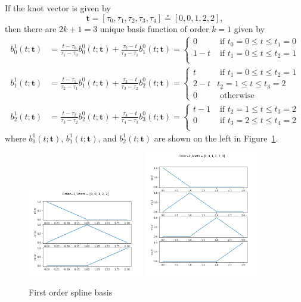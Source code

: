 \documentclass{article}
\newcommand{\defeq}{\circeq}
\begin{document}
If the knot vector is given by
\[
\mathbf{t} = [\tau_0, \tau_1, \tau_2, \tau_3, \tau_4] \defeq [0, 0, 1, 2, 2],
\]
then there are $2k+1=3$ unique basis function of order $k=1$ given by
\begin{align*}
b_0^1(t; \mathbf{t}) &= \frac{t-\tau_0}{\tau_1-\tau_0} b_0^0(t;\mathbf{t}) + \frac{\tau_2-t}{\tau_2-\tau_1}b_1^0(t; \mathbf{t}) 
	= \begin{cases} 0   & \text{~if~} t_0=0 \leq t \leq t_1=0 \\
				    1-t & \text{~if~} t_1=0 \leq t \leq t_2=1 \\ 
 	  \end{cases}
\\ 
b_1^1(t; \mathbf{t}) &= \frac{t-\tau_1}{\tau_2-\tau_1} b_1^0(t;\mathbf{t}) + \frac{\tau_3-t}{\tau_3-\tau_2}b_2^0(t; \mathbf{t})
	= \begin{cases} t & \text{~if~} t_1=0 \leq t \leq t_2=1 \\ 
 									2-t & t_2=1 \leq t \leq t_3=2 \\
 									0 & \text{~otherwise}
 					    \end{cases}
\\ 
b_2^1(t; \mathbf{t}) &= \frac{t-\tau_2}{\tau_3-\tau_2} b_2^0(t;\mathbf{t}) + \frac{\tau_4-t}{\tau_4-\tau_3}b_3^0(t; \mathbf{t})
	= \begin{cases} t-1 & \text{~if~} t_2=1 \leq t \leq t_3=2 \\ 
 					0 & \text{~if~} t_3=2 \leq t \leq t_4=2 \\
 	  \end{cases}
\end{align*}
where $b_0^1(t; \mathbf{t})$, $b_1^1(t; \mathbf{t})$, and $b_2^1(t; \mathbf{t})$ are shown on the left in Figure~\ref{fig:spline_basis_1}.
\begin{figure}[hbt]
  \centering
  	\includegraphics[width=0.45\textwidth]{./figures/spline_basis_1}
  	\includegraphics[width=0.45\textwidth]{./figures/spline_basis_1_extra_knot}
  \caption{First order spline basis}
  \label{fig:spline_basis_1}  
\end{figure}
\end{document}
